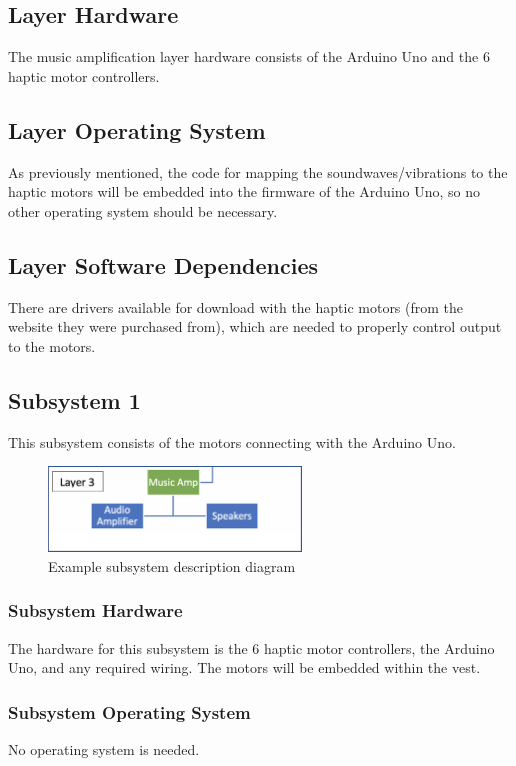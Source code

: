 \subsection{Layer Hardware}
The music amplification layer hardware consists of the Arduino Uno and the 6 haptic motor controllers.

\subsection{Layer Operating System}
As previously mentioned, the code for mapping the soundwaves/vibrations to the haptic motors will be embedded into the firmware of the Arduino Uno, so no other operating system should be necessary.

\subsection{Layer Software Dependencies}
There are drivers available for download with the haptic motors (from the website they were purchased from), which are needed to properly control output to the motors.

\subsection{Subsystem 1}
This subsystem consists of the motors connecting with the Arduino Uno.

\begin{figure}[h!]
	\centering
 	\includegraphics[width=0.60\textwidth]{architectural design specification latex/images/subsystem3.png}
 \caption{Example subsystem description diagram}
\end{figure}

\subsubsection{Subsystem Hardware}
The hardware for this subsystem is the 6 haptic motor controllers, the Arduino Uno, and any required wiring. The motors will be embedded within the vest.

\subsubsection{Subsystem Operating System}
No operating system is needed.

